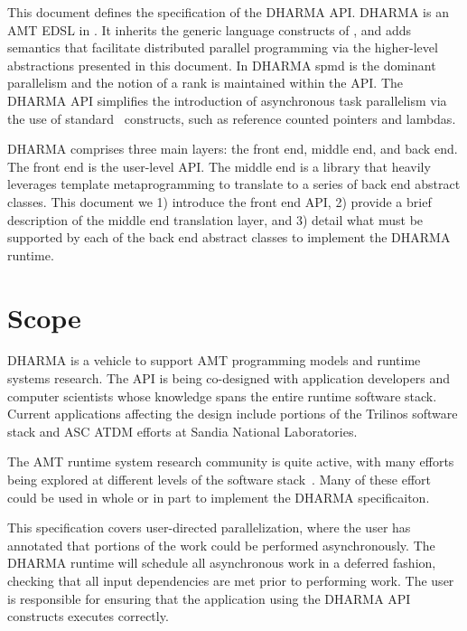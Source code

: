 This document defines the specification of the DHARMA \gls{API}.
DHARMA is an \gls{AMT} \gls{EDSL} in \CC.
It inherits the generic language constructs of \CC, and adds 
\gls{semantics} that facilitate distributed parallel programming via the
higher-level abstractions presented in this document.   
In DHARMA \gls{spmd} is the dominant parallelism and the notion of a \gls{rank}
is maintained within the \gls{API}.   
  The DHARMA \gls{API} simplifies the introduction
  of asynchronous task parallelism via the use of standard \CC\ constructs, such
  as \gls{reference counted pointers} and \glspl{lambda}.



DHARMA comprises three main layers: the \gls{front end}, \gls{middle end}, and
\gls{back end}.  The \gls{front end} is the user-level \gls{API}.  The
\gls{middle end} is a library that heavily leverages \CC \gls{template metaprogramming} 
to translate to a series of \gls{back end} abstract classes.
This document we 1) introduce the \gls{front end} \gls{API}, 2) provide a brief
description of the \gls{middle end} translation layer, and 3) detail what must be
supported by each of the \gls{back end} abstract classes to implement the DHARMA runtime.



\section{Scope}
\label{sec:scope}
DHARMA is a vehicle to support AMT programming models and runtime
systems research.  The \gls{API} is being \gls{co-design}ed with application developers
and computer scientists whose knowledge spans the entire runtime software stack.
Current applications affecting the design include portions of the \gls{Trilinos} software stack
and \gls{ASC} \gls{ATDM} efforts at Sandia National Laboratories. 
 

The \gls{AMT} \gls{runtime system} research community is quite active, with many efforts being
explored at different levels of the software stack~\cite{OCR,STAPL,Legion,StencilHPX,Charm++,Uintah, Loci}. 
Many of these effort could be used in whole or in part to implement the DHARMA
specificaiton.

This specification covers user-directed parallelization, where the user
has annotated that portions of the work could be performed asynchronously.
The DHARMA runtime will schedule all asynchronous work in a \gls{deferred} fashion,
checking that all \gls{input dependencies} are met prior to performing work.  
The user is responsible for ensuring that the application using the DHARMA
\gls{API} constructs executes correctly.


